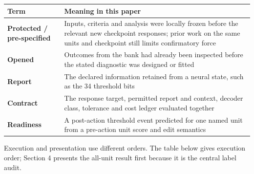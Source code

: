 \documentclass[
  british,
  11pt,
  a4paper,
]{article}
\newcounter{none} %
\begin{document}
{\def\LTcaptype{none} %
\begin{longtable}[]{@{}
  >{\raggedright\arraybackslash}p{}
  >{\raggedright\arraybackslash}p{}@{}}
\toprule\noalign{}
\begin{minipage}[b]{\linewidth}\raggedright
Term
\end{minipage} & \begin{minipage}[b]{\linewidth}\raggedright
Meaning in this paper
\end{minipage} \\
\midrule\noalign{}
\endhead
\bottomrule\noalign{}
\endlastfoot
\textbf{Protected / pre-specified} & Inputs, criteria and analysis were
locally frozen before the relevant new checkpoint responses; prior work
on the same units and checkpoint still limits confirmatory force \\
\textbf{Opened} & Outcomes from the bank had already been inspected
before the stated diagnostic was designed or fitted \\
\textbf{Report} & The declared information retained from a neural state,
such as the 34 threshold bits \\
\textbf{Contract} & The response target, permitted report and context,
decoder class, tolerance and cost ledger evaluated together \\
\textbf{Readiness} & A post-action threshold event predicted for one
named unit from a pre-action unit score and edit semantics \\
\end{longtable}
}

Execution and presentation use different orders. The table below gives
execution order; Section 4 presents the all-unit result first because it
is the central label audit.
\end{document}
